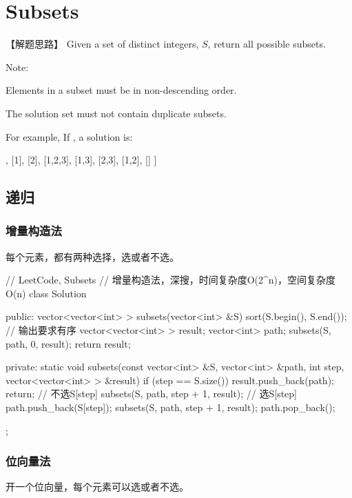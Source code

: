 \section{Subsets} %
\label{sec:subsets}


【解题思路】
Given a set of distinct integers, $S$, return all possible subsets.

Note:
\begindot
\item Elements in a subset must be in non-descending order.
\item The solution set must not contain duplicate subsets.
\myenddot

For example, If , a solution is:
\begin{Code}
	[
	[3],
	[1],
	[2],
	[1,2,3],
	[1,3],
	[2,3],
	[1,2],
	[]
	]
\end{Code}


\subsection{递归}


\subsubsection{增量构造法}
每个元素，都有两种选择，选或者不选。

\begin{Code}
	// LeetCode, Subsets
	// 增量构造法，深搜，时间复杂度O(2^n)，空间复杂度O(n)
	class Solution {
		public:
		vector<vector<int> > subsets(vector<int> &S) {
			sort(S.begin(), S.end());  // 输出要求有序
			vector<vector<int> > result;
			vector<int> path;
			subsets(S, path, 0, result);
			return result;
		}
		
		private:
		static void subsets(const vector<int> &S, vector<int> &path, int step,
		vector<vector<int> > &result) {
			if (step == S.size()) {
				result.push_back(path);
				return;
			}
			// 不选S[step]
			subsets(S, path, step + 1, result);
			// 选S[step]
			path.push_back(S[step]);
			subsets(S, path, step + 1, result);
			path.pop_back();
		}
	};
\end{Code}


\subsubsection{位向量法}
开一个位向量，每个元素可以选或者不选。

